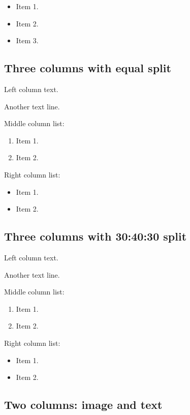 \documentclass[
  11pt,
  ignorenonframetext,
]{article}
\providecommand{\tightlist}{%
  \setlength{\itemsep}{0pt}\setlength{\parskip}{0pt}}
\begin{document}
\begin{itemize}
\tightlist
\item
  Item 1.
\item
  Item 2.
\item
  Item 3.
\end{itemize}

\subsection{Three columns with equal
split}\label{three-columns-with-equal-split}

Left column text.

Another text line.

Middle column list:

\begin{enumerate}
\tightlist
\item
  Item 1.
\item
  Item 2.
\end{enumerate}

Right column list:

\begin{itemize}
\tightlist
\item
  Item 1.
\item
  Item 2.
\end{itemize}

\subsection{Three columns with 30:40:30
split}\label{three-columns-with-304030-split}

Left column text.

Another text line.

Middle column list:

\begin{enumerate}
\tightlist
\item
  Item 1.
\item
  Item 2.
\end{enumerate}

Right column list:

\begin{itemize}
\tightlist
\item
  Item 1.
\item
  Item 2.
\end{itemize}

\subsection{Two columns: image and
text}\label{two-columns-image-and-text}
\end{document}
